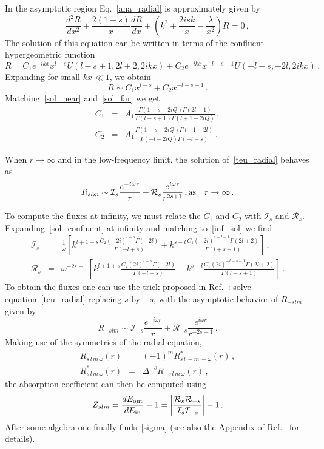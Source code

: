 \documentclass[11pt]{article}
\newcommand{\be}{\begin{equation}}
\newcommand{\ee}{\end{equation}}
\newcommand{\bea}{\begin{eqnarray}}
\newcommand{\eea}{\end{eqnarray}}
\def\beq{\begin{eqnarray}}
\def\eeq{\end{eqnarray}}
\newcommand{\nn}{\nonumber}
\numberwithin{equation}{section} %
\begin{document}
In the asymptotic region Eq.~\eqref{ana_radial} is approximately given by
%
\be\label{near_radial2}
\frac{d^2R}{dx^2}+\frac{2(1+s)}{x}\frac{dR}{dx}+\left(k^2+\frac{2isk}{x}-\frac{\lambda}{x^2}\right)R=0\,,
\ee
%
The solution of this equation can be written in terms of the confluent hypergeometric function 
%
\be\label{sol_confluent}
R=C_1e^{-i kx}x^{l-s}U(l-s+1,2l+2,2ikx)+C_2e^{-ik x}x^{-l-s-1}U(-l-s,-2l,2ikx)\,.
\ee
%
Expanding for small $kx\ll 1$, we obtain
%
\be\label{sol_far}
R\sim C_1x^{l-s}+C_2x^{-l-s-1}\,.
\ee
%
Matching~\eqref{sol_near} and~\eqref{sol_far} we get
%
\bea
C_1&=&A_1\frac{\Gamma(1-s-2iQ)\Gamma(2l+1)}{\Gamma(l-s+1)\Gamma(l+1-2iQ)}\,,\\
C_2&=&A_1\frac{\Gamma(1-s-2iQ)\Gamma(-1-2l)}{\Gamma(-l-2iQ)\Gamma(-l-s)}\,.
\eea
%

When $r\to \infty$ and in the low-frequency limit, the solution of~\eqref{teu_radial} behaves as
%
\be\label{inf_sol}
R_{slm}\sim \mathcal{I}_s\frac{e^{-i\omega r}}{r}+\mathcal{R}_s\frac{e^{i\omega r}}{r^{2s+1}}\,, {\rm as} \quad r \to \infty\,.
\ee
%

To compute the fluxes at infinity, we must relate the $C_1$ and $C_2$ with $\mathcal{I}_s$ and $\mathcal{R}_s$. Expanding~\eqref{sol_confluent} at infinity and matching to~\eqref{inf_sol} we find
%
\bea
\mathcal{I}_s&=&\frac{1}{\omega}\left[k^{l+1+s}\frac{C_2 (-2i)^{l+s} \Gamma (-2 l)}{\Gamma (-l+s)}+k^{s-l}\frac{C_1 (-2 i)^{s-l-1} \Gamma (2 l+2)}{\Gamma (l+s+1)}\right]\,,\\
\mathcal{R}_s&=&\omega ^{-2 s-1} \left[k^{l+1+s}\frac{C_2 (2i)^{l-s} \Gamma (-2 l)}{\Gamma (-l-s)}+k^{s-l}\frac{C_1 (2 i)^{-l-s-1} \Gamma (2
   l+2)}{\Gamma (l-s+1)}\right]\,.
\eea
% 
To obtain the fluxes one can use the trick proposed in Ref.~\cite{Page:1976df}: solve equation~\eqref{teu_radial} replacing $s$ by $-s$, with the asymptotic behavior of $R_{-slm}$ given by
%
\be
R_{-slm}\sim \mathcal{I}_{-s}\frac{e^{-i\omega r}}{r}+\mathcal{R}_{-s}\frac{e^{i\omega r}}{r^{-2s+1}}\,.
\ee
%
Making use of the symmetries of the radial equation,
\beq\label{teu_sym}
R_{s\,l\,m\,\omega}(r)&=&(-1)^{m} R^*_{s\,l\,-m\,-\omega}(r)\,,\nn\\
%
R^*_{s\,l\,m\,\omega}(r)&=&\Delta^{-s} R_{-s\,l\,m\,\omega}(r)\,,
%
\eeq
%
the absorption coefficient can then be computed using
%
\be
Z_{slm}=\frac{dE_{\rm out}}{dE_{\rm in}}-1=\left|\frac{\mathcal{R}_s\mathcal{R}_{-s}}{\mathcal{I}_s\mathcal{I}_{-s}}\right|-1\,.
\ee
%
After some algebra one finally finds~\eqref{sigma} (see also the Appendix of Ref.~\cite{Page:1976df} for details).
\end{document}
